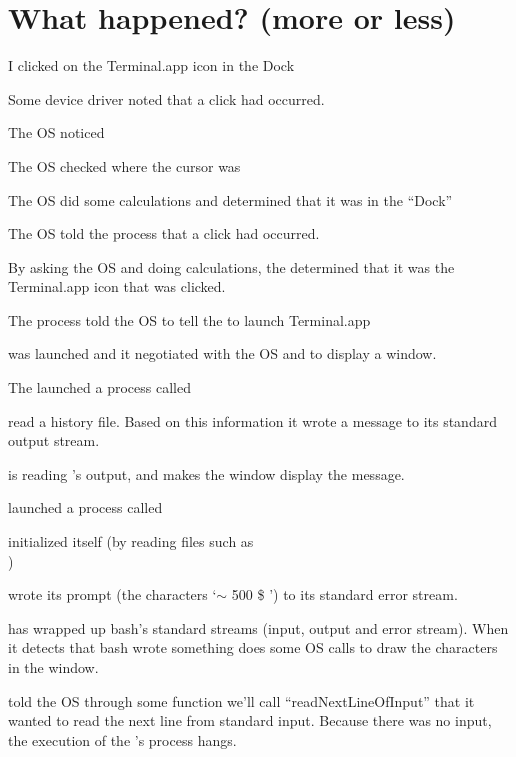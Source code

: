 \documentclass[landscape]{foils}
\begin{document}
\pagecolor{white}

\myNewSlide
\section*{What happened? (more or less)}
\begin{compactitem}
	\item I clicked on the Terminal.app icon in the Dock
	\item Some device driver noted that a click had occurred.
	\item The OS noticed
	\item The OS checked where the cursor was
	\item The OS did some calculations and determined that it was in the ``Dock''
	\item The OS told the  process that a click had occurred.
	\item By asking the OS and doing calculations, the  determined that it was the Terminal.app icon that was clicked.
	\item The  process told the OS to tell the  to launch Terminal.app
	\item {} was launched and {\color{green} it negotiated with the OS and  to display a window.}
	\item {\color{green} The  launched a process called }
	\item {\color{black}  read a history file. Based on this information it wrote a message to its standard output stream. }
	\item {\color{green}  is reading 's output, and  makes the window display the message.}
	\item {\color{black}  launched a process called }
	\item {\color{red}  initialized itself (by reading files such as\\ )}
	\item {\color{red} wrote its prompt (the characters `$\sim$ 500 \$ ') to its standard error stream.}
	\item {\color{green} has wrapped up bash's standard streams (input, output and error stream). When
	it detects that bash wrote something  does some OS calls to draw the characters in the window.}
	\item {\color{red} told the OS through some function we'll call ``readNextLineOfInput'' that it wanted to read the next line from standard input.  Because there was no input, the execution of the 's process hangs.}

\end{compactitem}
\end{document}
